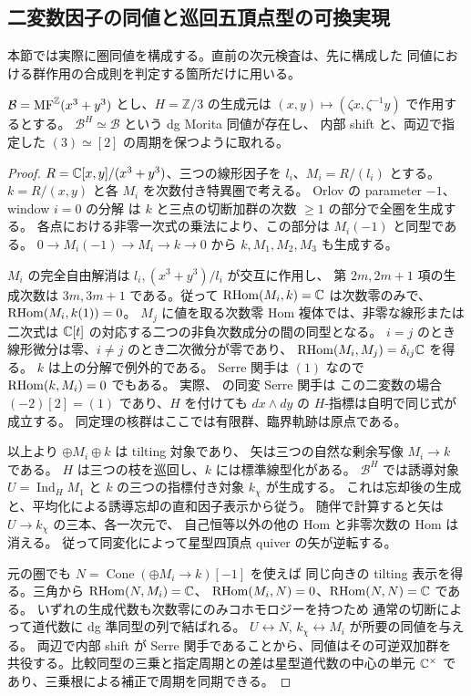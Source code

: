 \subsection{二変数因子の同値と巡回五頂点型の可換実現}
\label{nqr:sec:roots}
本節では実際に圏同値を構成する。直前の次元検査は、先に構成した
同値における群作用の合成則を判定する箇所だけに用いる。

\begin{lemma}[二変数三次の巡回同変化]\label{nqr:lem:binary}
$\mathcal B=\operatorname{MF}^{\mathbb Z}(x^3+y^3)$ とし、$H=\mathbb Z/3$ の生成元は
$(x,y)\mapsto(\zeta x,\zeta^{-1}y)$ で作用するとする。
$\mathcal B^H\simeq\mathcal B$ という dg Morita 同値が存在し、
内部 shift と、両辺で指定した $(3)\simeq[2]$ の周期を保つように取れる。
\end{lemma}
\begin{proof}
$R=\mathbb C[x,y]/(x^3+y^3)$、三つの線形因子を $l_i$、$M_i=R/(l_i)$ とする。
$k=R/(x,y)$ と各 $M_i$ を次数付き特異圏で考える。
Orlov の parameter $-1$、window $i=0$ の分解
\cite[Theorem~2.5(ii) and its proof]{NFMOrlovSingularities}は
$k$ と三点の切断加群の次数 $\ge1$ の部分で全圏を生成する。
各点における非零一次式の乗法により、この部分は $M_i(-1)$ と同型である。
$0\to M_i(-1)\to M_i\to k\to0$ から $k,M_1,M_2,M_3$ も生成する。

$M_i$ の完全自由解消は $l_i,(x^3+y^3)/l_i$ が交互に作用し、
第 $2m,2m+1$ 項の生成次数は $3m,3m+1$ である。従って
$\operatorname{RHom}(M_i,k)=\mathbb C$ は次数零のみで、$\operatorname{RHom}(M_i,k(1))=0$。
$M_j$ に値を取る次数零 Hom 複体では、非零な線形または二次式は
$\mathbb C[t]$ の対応する二つの非負次数成分の間の同型となる。
$i=j$ のとき線形微分は零、$i\ne j$ のとき二次微分が零であり、
$\operatorname{RHom}(M_i,M_j)=\delta_{ij}\mathbb C$ を得る。
$k$ は上の分解で例外的である。
Serre 関手は $(1)$ なので $\operatorname{RHom}(k,M_i)=0$ でもある。
実際、\cite[Theorem~2.18]{NQRFaveroKelly} の同変 Serre 関手は
この二変数の場合 $(-2)[2]=(1)$ であり、$H$ を付けても
$dx\wedge dy$ の $H$-指標は自明で同じ式が成立する。
同定理の核群はここでは有限群、臨界軌跡は原点である。

以上より $\oplus M_i\oplus k$ は tilting 対象であり、
矢は三つの自然な剰余写像 $M_i\to k$ である。
$H$ は三つの枝を巡回し、$k$ には標準線型化がある。
$\mathcal B^H$ では誘導対象 $U=\operatorname{Ind}_H M_1$ と
$k$ の三つの指標付き対象 $k_\chi$ が生成する。
これは忘却後の生成と、平均化による誘導忘却の直和因子表示から従う。
随伴で計算すると矢は $U\to k_\chi$ の三本、各一次元で、
自己恒等以外の他の Hom と非零次数の Hom は消える。
従って同変化によって星型四頂点 quiver の矢が逆転する。

元の圏でも $N=\operatorname{Cone}(\oplus M_i\to k)[-1]$ を使えば
同じ向きの tilting 表示を得る。三角から $\operatorname{RHom}(N,M_i)=\mathbb C$、
$\operatorname{RHom}(M_i,N)=0$、$\operatorname{RHom}(N,N)=\mathbb C$ である。
いずれの生成代数も次数零にのみコホモロジーを持つため
通常の切断によって道代数に dg 準同型の列で結ばれる。
$U\leftrightarrow N$, $k_\chi\leftrightarrow M_i$ が所要の同値を与える。
両辺で内部 shift が Serre 関手であることから、同値はその可逆双加群を
共役する。比較同型の三乗と指定周期との差は星型道代数の中心の単元
$\mathbb C^\times$ であり、三乗根による補正で周期を同期できる。
\end{proof}


